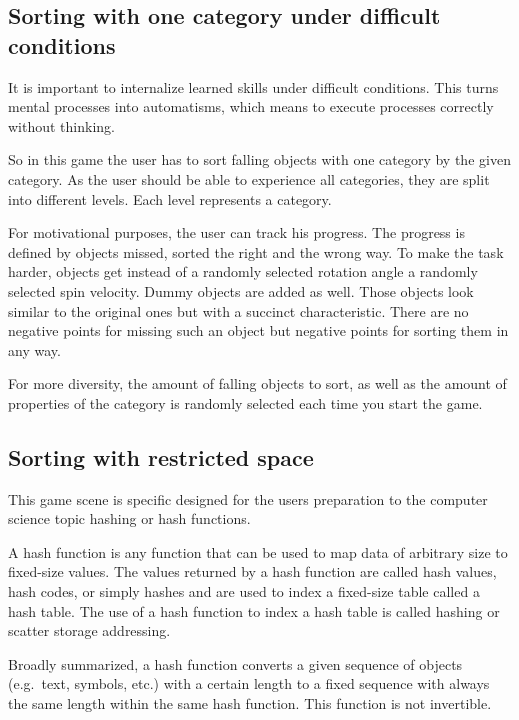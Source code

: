 \subsection{Sorting with one category under difficult conditions}\label{subsec:sorting-with-one-category-under-difficult-conditions}
It is important to internalize learned skills under difficult conditions.
This turns mental processes into automatisms, which means to execute processes correctly without thinking.

So in this game the user has to sort falling objects with one category by the given category.
As the user should be able to experience all categories, they are split into different levels.
Each level represents a category.

For motivational purposes, the user can track his progress.
The progress is defined by objects missed, sorted the right and the wrong way.
To make the task harder, objects get instead of a randomly selected rotation angle a randomly selected spin velocity.
Dummy objects are added as well.
Those objects look similar to the original ones but with a succinct characteristic.
There are no negative points for missing such an object but negative points for sorting them in any way.

For more diversity, the amount of falling objects to sort, as well as the amount of properties of the category
is randomly selected each time you start the game.

\subsection{Sorting with restricted space}\label{subsec:sorting-with-restricted-space}
This game scene is specific designed for the users preparation to the computer science topic hashing or hash functions.

A hash function is any function that can be used to map data of arbitrary size to fixed-size values.
The values returned by a hash function are called hash values, hash codes, or simply hashes and
are used to index a fixed-size table called a hash table.
The use of a hash function to index a hash table is called hashing or scatter storage addressing.\cite{artofcomputerscience}

Broadly summarized, a hash function converts a given sequence of objects (e.g.\ text, symbols, etc.)
with a certain length to a fixed sequence with always the same length within the same hash function.
This function is not invertible.


